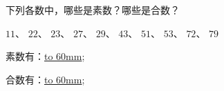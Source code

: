 下列各数中，哪些是素数？哪些是合数？

$11$、 $22$、 $23$、 $27$、 $29$、 $43$、 $51$、 $53$、 $72$、 $79$

素数有：\underline{\hbox to 60mm{}};

合数有：\underline{\hbox to 60mm{}};